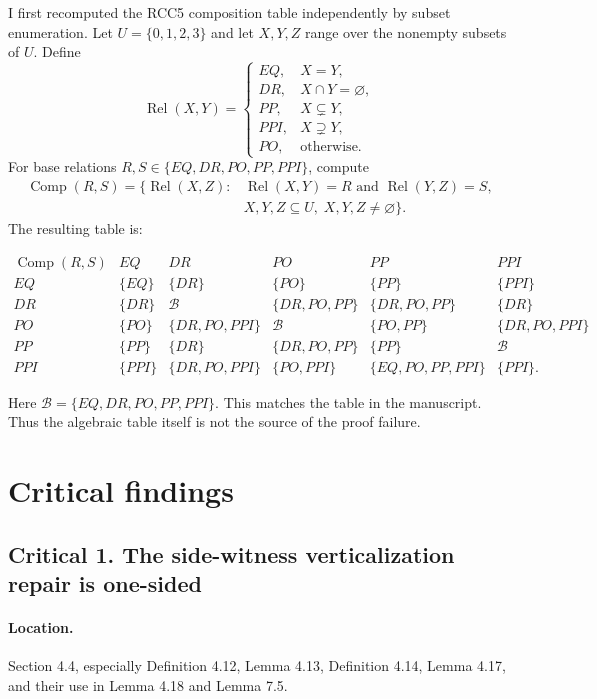 \documentclass[11pt]{article}
\newcommand{\Comp}{\operatorname{Comp}}
\newcommand{\Rel}{\operatorname{Rel}}
\newcommand{\B}{\mathcal B}
\begin{document}
I first recomputed the RCC5 composition table independently by subset enumeration. Let $U=\{0,1,2,3\}$ and let $X,Y,Z$ range over the nonempty subsets of $U$. Define
\[
\Rel(X,Y)=
\begin{cases}
EQ, & X=Y,\\
DR, & X\cap Y=\varnothing,\\
PP, & X\subsetneq Y,\\
PPI, & X\supsetneq Y,\\
PO, & \text{otherwise.}
\end{cases}
\]
For base relations $R,S\in \{EQ,DR,PO,PP,PPI\}$, compute
\[
\begin{aligned}
\Comp(R,S)=\{\Rel(X,Z):{}& \Rel(X,Y)=R \text{ and } \Rel(Y,Z)=S,\\
& X,Y,Z\subseteq U,\; X,Y,Z\ne\varnothing\}.
\end{aligned}
\]
The resulting table is:
\begin{center}
\small
$\begin{array}{c|ccccc}
\Comp(R,S) & EQ & DR & PO & PP & PPI\\
\hline
EQ  & \{EQ\} & \{DR\} & \{PO\} & \{PP\} & \{PPI\}\\
DR  & \{DR\} & \B & \{DR,PO,PP\} & \{DR,PO,PP\} & \{DR\}\\
PO  & \{PO\} & \{DR,PO,PPI\} & \B & \{PO,PP\} & \{DR,PO,PPI\}\\
PP  & \{PP\} & \{DR\} & \{DR,PO,PP\} & \{PP\} & \B\\
PPI & \{PPI\} & \{DR,PO,PPI\} & \{PO,PPI\} & \{EQ,PO,PP,PPI\} & \{PPI\}.
\end{array}$
\end{center}
Here $\B=\{EQ,DR,PO,PP,PPI\}$. This matches the table in the manuscript. Thus the algebraic table itself is not the source of the proof failure.

\section{Critical findings}

\subsection*{Critical 1. The side-witness verticalization repair is one-sided}

\paragraph{Location.} Section 4.4, especially Definition 4.12, Lemma 4.13, Definition 4.14, Lemma 4.17, and their use in Lemma 4.18 and Lemma 7.5.
\end{document}
